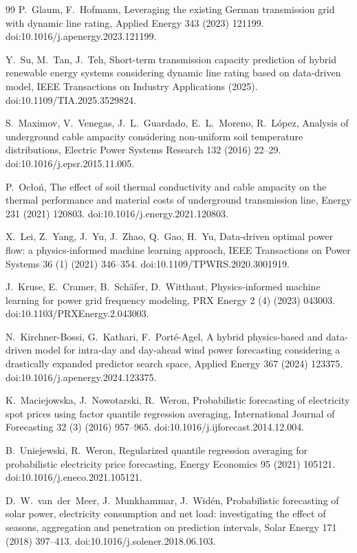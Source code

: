 \documentclass[preprint,3p,times]{elsarticle}
\begin{document}
\begin{thebibliography}{99}
P.~Glaum, F.~Hofmann,
Leveraging the existing German transmission grid with dynamic line rating,
Applied Energy 343 (2023) 121199.
doi:10.1016/j.apenergy.2023.121199.

Y.~Su, M.~Tan, J.~Teh,
Short-term transmission capacity prediction of hybrid renewable energy systems considering dynamic line rating based on data-driven model,
IEEE Transactions on Industry Applications (2025).
doi:10.1109/TIA.2025.3529824.

S.~Maximov, V.~Venegas, J.~L.~Guardado, E.~L.~Moreno, R.~L\'opez,
Analysis of underground cable ampacity considering non-uniform soil temperature distributions,
Electric Power Systems Research 132 (2016) 22--29.
doi:10.1016/j.epsr.2015.11.005.

P.~Ocło\'n,
The effect of soil thermal conductivity and cable ampacity on the thermal performance and material costs of underground transmission line,
Energy 231 (2021) 120803.
doi:10.1016/j.energy.2021.120803.

X.~Lei, Z.~Yang, J.~Yu, J.~Zhao, Q.~Gao, H.~Yu,
Data-driven optimal power flow: a physics-informed machine learning approach,
IEEE Transactions on Power Systems 36 (1) (2021) 346--354.
doi:10.1109/TPWRS.2020.3001919.

J.~Kruse, E.~Cramer, B.~Sch\"afer, D.~Witthaut,
Physics-informed machine learning for power grid frequency modeling,
PRX Energy 2 (4) (2023) 043003.
doi:10.1103/PRXEnergy.2.043003.

N.~Kirchner-Bossi, G.~Kathari, F.~Port\'e-Agel,
A hybrid physics-based and data-driven model for intra-day and day-ahead wind power forecasting considering a drastically expanded predictor search space,
Applied Energy 367 (2024) 123375.
doi:10.1016/j.apenergy.2024.123375.

K.~Maciejowska, J.~Nowotarski, R.~Weron,
Probabilistic forecasting of electricity spot prices using factor quantile regression averaging,
International Journal of Forecasting 32 (3) (2016) 957--965.
doi:10.1016/j.ijforecast.2014.12.004.

B.~Uniejewski, R.~Weron,
Regularized quantile regression averaging for probabilistic electricity price forecasting,
Energy Economics 95 (2021) 105121.
doi:10.1016/j.eneco.2021.105121.

D.~W.~van~der~Meer, J.~Munkhammar, J.~Wid\'en,
Probabilistic forecasting of solar power, electricity consumption and net load: investigating the effect of seasons, aggregation and penetration on prediction intervals,
Solar Energy 171 (2018) 397--413.
doi:10.1016/j.solener.2018.06.103.


\end{thebibliography}
\end{document}
